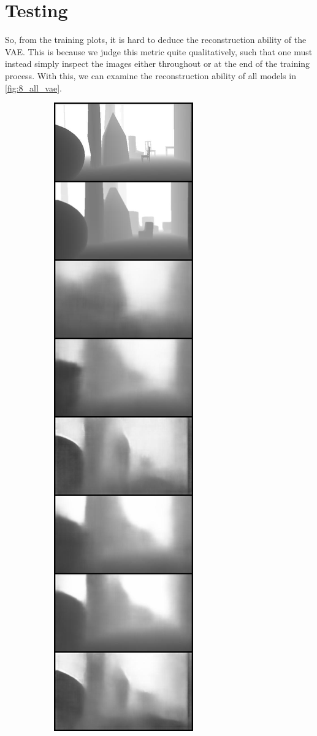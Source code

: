\section{Testing}
\label{sec:8_testing}
So, from the training plots, it is hard to deduce the reconstruction ability of the VAE. This is because we judge this metric quite qualitatively, such that one must instead simply inspect the images either throughout or at the end of the training process. With this, we can examine the reconstruction ability of all models in \cref{fig:8_all_vae}.
\begin{figure}[htb]
    \centering
    \begin{subfigure}[b]{0.3\textwidth}
        \centering
        \includegraphics[height=\textheight]{figures/8_/the_same_4.jpg}

\end{subfigure}
\end{figure}

